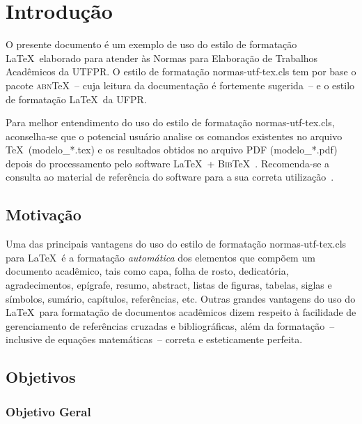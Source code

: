 \chapter{Introdu\c{c}\~ao}

O presente documento \'e um exemplo de uso do estilo de formata\c{c}\~ao \LaTeX\ elaborado para atender \`as Normas para Elabora\c{c}\~ao de Trabalhos Acad\^emicos da UTFPR. O estilo de formata\c{c}\~ao {\ttfamily normas-utf-tex.cls} tem por base o pacote \textsc{abn}\TeX~-- cuja leitura da documenta\c{c}\~ao \cite{abnTeX2009} \'e fortemente sugerida~-- e o estilo de formata\c{c}\~ao \LaTeX\ da UFPR.

Para melhor entendimento do uso do estilo de formata\c{c}\~ao {\ttfamily normas-utf-tex.cls}, aconselha-se que o potencial usu\'ario analise os comandos existentes no arquivo \TeX\ ({\ttfamily modelo\_*.tex}) e os resultados obtidos no arquivo PDF ({\ttfamily modelo\_*.pdf}) depois do processamento pelo software \LaTeX\ + \textsc{Bib}\TeX~\cite{LaTeX2009,BibTeX2009}. Recomenda-se a consulta ao material de refer\^encia do software para a sua correta utiliza\c{c}\~ao~\cite{Lamport1986,Buerger1989,Kopka2003,Mittelbach2004}.

\section{Motiva\c{c}\~ao}

Uma das principais vantagens do uso do estilo de formata\c{c}\~ao {\ttfamily normas-utf-tex.cls} para \LaTeX\ \'e a formata\c{c}\~ao \textit{autom\'atica} dos elementos que comp\~oem um documento acad\^emico, tais como capa, folha de rosto, dedicat\'oria, agradecimentos, ep\'igrafe, resumo, abstract, listas de figuras, tabelas, siglas e s\'imbolos, sum\'ario, cap\'itulos, refer\^encias, etc. Outras grandes vantagens do uso do \LaTeX\ para formata\c{c}\~ao de documentos acad\^emicos dizem respeito \`a facilidade de gerenciamento de refer\^encias cruzadas e bibliogr\'aficas, al\'em da formata\c{c}\~ao~-- inclusive de equa\c{c}\~oes  matem\'aticas~-- correta e esteticamente perfeita.

\section{Objetivos}

\subsection{Objetivo Geral}

